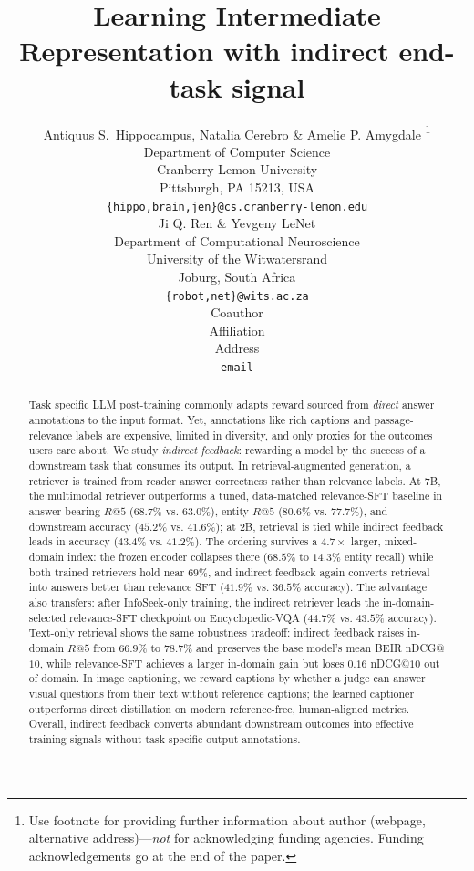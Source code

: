 \documentclass{article} %
\title{Learning Intermediate Representation with indirect end-task signal}
\author{Antiquus S.~Hippocampus, Natalia Cerebro \& Amelie P. Amygdale \thanks{ Use footnote for providing further information
about author (webpage, alternative address)---\emph{not} for acknowledging
funding agencies.  Funding acknowledgements go at the end of the paper.} \\
Department of Computer Science\\
Cranberry-Lemon University\\
Pittsburgh, PA 15213, USA \\
\texttt{\{hippo,brain,jen\}@cs.cranberry-lemon.edu} \\
\And
Ji Q. Ren \& Yevgeny LeNet \\
Department of Computational Neuroscience \\
University of the Witwatersrand \\
Joburg, South Africa \\
\texttt{\{robot,net\}@wits.ac.za} \\
\AND
Coauthor \\
Affiliation \\
Address \\
\texttt{email}
}
\begin{document}
\maketitle

\begin{abstract}
Task specific LLM post-training commonly adapts reward sourced from \emph{direct} answer annotations to the input format. Yet, annotations like rich captions and passage-relevance labels are expensive, limited in diversity, and only proxies for the outcomes users care about. We study \emph{indirect feedback}: rewarding a model by the success of a downstream task that consumes its output. In retrieval-augmented generation, a retriever is trained from reader answer correctness rather than relevance labels. At 7B, the multimodal retriever outperforms a tuned, data-matched relevance-SFT
baseline in answer-bearing $R@5$ ($68.7\%$ vs. $63.0\%$), entity $R@5$ ($80.6\%$ vs. $77.7\%$),
and downstream accuracy ($45.2\%$ vs. $41.6\%$); at 2B, retrieval is tied while indirect feedback
leads in accuracy ($43.4\%$ vs. $41.2\%$). The ordering survives a $4.7\times$ larger,
mixed-domain index: the frozen encoder collapses there ($68.5\%$ to $14.3\%$ entity recall) while
both trained retrievers hold near $69\%$, and indirect feedback again converts retrieval into
answers better than relevance SFT ($41.9\%$ vs. $36.5\%$ accuracy). The advantage also transfers: after InfoSeek-only training, the indirect retriever
leads the in-domain-selected relevance-SFT checkpoint on Encyclopedic-VQA ($44.7\%$ vs. $43.5\%$ accuracy). Text-only retrieval shows the same robustness tradeoff: indirect
feedback raises in-domain $R@5$ from $66.9\%$ to $78.7\%$ and preserves the base model's mean BEIR
nDCG@$10$, while relevance-SFT achieves a larger in-domain gain but loses $0.16$ nDCG@$10$ out of
domain. In image captioning, we reward captions by whether a judge can answer visual questions from
their text without reference captions; the learned captioner outperforms direct distillation on
modern reference-free, human-aligned metrics. Overall, indirect feedback converts abundant
downstream outcomes into effective training signals without task-specific output annotations.

\end{abstract}















\appendix


\end{document}
